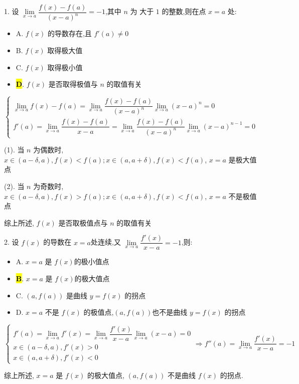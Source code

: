 1. 设 $\lim\limits_{x\to a}\dfrac{f(x)-f(a)}{(x-a)^{n}}=-1$,其中 $n$ 为 大于 $1$ 的整数,则在点 $x=a$ 处:
\begin{itemize}
	\item A. $f(x)$ 的导数存在,且 $f'(a)\neq 0$
	\item B. $f(x)$ 取得极大值
	\item C. $f(x)$ 取得极小值
	\item \hl{\textbf{D}}. $f(x)$ 是否取得极值与 $n$ 的取值有关
\end{itemize}
\begin{solution}

	$$\begin{cases}
		\lim\limits_{x\to a} f(x)-f(a) = \lim\limits_{x\to a}\dfrac{f(x)-f(a)}{(x-a)^{n}}\lim\limits_{x\to a}(x-a)^{n} = 0\\
		f'(a) = \lim\limits_{x\to a}\dfrac{f(x)-f(a)}{x-a} =\lim\limits_{x\to a}\dfrac{f(x)-f(a)}{(x-a)^{n}}\lim\limits_{x\to a}(x-a)^{n-1} =0
	\end{cases}$$

	(1). 当 $n$ 为偶数时, $x\in (a-\delta,a), f(x) < f(a); x\in (a,a+\delta), f(x) < f(a)$, $x=a$ 是极大值点

	(2). 当 $n$ 为奇数时, $x\in (a-\delta,a), f(x) > f(a); x\in (a,a+\delta), f(x) < f(a)$, $x=a$ 不是极值点

	综上所述, $f(x)$ 是否取极值点与 $n$ 的取值有关
\end{solution}

2. 设 $f(x)$ 的导数在 $x=a$处连续,又 $\lim\limits_{x\to a}\dfrac{f'(x)}{x-a}=-1$,则:
\begin{itemize}
	\item A. $x=a$ 是 $f(x)$的极小值点
	\item \hl{\textbf{B}}. $x=a$ 是 $f(x)$的极大值点
	\item C. $(a,f(a))$ 是曲线 $y=f(x)$ 的拐点
	\item D. $x=a$ 不是 $f(x)$ 的极值点,$(a,f(a))$也不是曲线 $y=f(x)$ 的拐点
\end{itemize}
\begin{solution}

	$$\begin{cases}
		f'(a) = \lim\limits_{x\to a} f'(x) = \lim\limits_{x\to a}\dfrac{f'(x)}{x-a}\lim\limits_{x\to a}(x-a) = 0\\
		x\in (a-\delta,a), f'(x) > 0\\
		x\in (a,a+\delta), f'(x) < 0
	\end{cases}\Rightarrow f''(a) = \lim\limits_{x\to a}\dfrac{f'(x)}{x-a} = -1$$

	综上所述, $x = a$ 是 $f(x)$ 的极大值点, $(a,f(a))$ 不是曲线 $f(x)$ 的拐点.
\end{solution}


